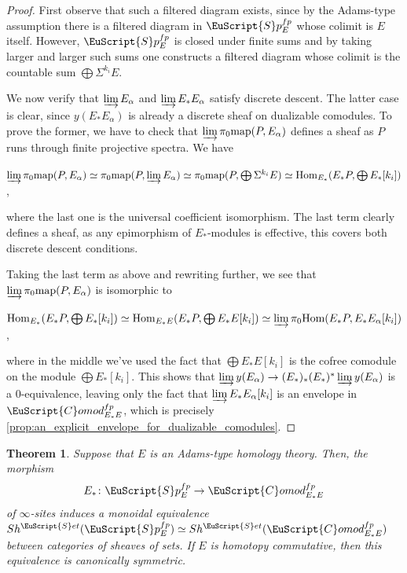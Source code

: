 \documentclass[oneside,a4paper]{amsart}
\newcommand{\euscr}[1]{\EuScript{#1}} %
\newcommand{\Hom}{\textnormal{Hom}} %
\newcommand{\map}{\textnormal{map}} %
\newcommand{\spectra}{\euscr{S}p} %
\newcommand{\sets}{\euscr{S}et} %
\newcommand{\spectrafp}{\spectra_{E}^{fp}} %
\newcommand{\Comod}{\euscr{C}omod} %
\newcommand{\ComodE}{\Comod_{E_{*}E}} %
\theoremstyle{plain}
\newtheorem{thm}{Theorem}[section]
\theoremstyle{definition}
\theoremstyle{remark}
\begin{document}
\begin{proof}
First observe that such a filtered diagram exists, since by the Adams-type assumption there is a filtered diagram in $\spectrafp$ whose colimit is $E$ itself. However, $\spectrafp$ is closed under finite sums and by taking larger and larger such sums one constructs a filtered diagram whose colimit is the countable sum $\bigoplus \Sigma^{k_{i}} E$. 

We now verify that $\varinjlim E_{\alpha}$ and $\varinjlim E_{*}E_{\alpha}$ satisfy discrete descent. The latter case is clear, since $y(E_{*}E_{\alpha})$ is already a discrete sheaf on dualizable comodules. To prove the former, we have to check that $\varinjlim \pi_{0} \map(P, E_{\alpha})$ defines a sheaf as $P$ runs through finite projective spectra. We have 

\begin{center}
$\varinjlim \pi_{0} \map(P, E_{\alpha}) \simeq \pi_{0} \map(P, \varinjlim E_{\alpha}) \simeq \pi_{0} \map(P, \bigoplus \Sigma^{k_{i}} E) \simeq \Hom_{E_{*}}(E_{*}P, \bigoplus E_{*}[k_{i}])$,
\end{center}
where the last one is the universal coefficient isomorphism. The last term clearly defines a sheaf, as any epimorphism of $E_{*}$-modules is effective, this covers both discrete descent conditions. 

Taking the last term as above and rewriting further, we see that $\varinjlim \pi_{0} \map(P, E_{\alpha})$ is isomorphic to

\begin{center}
$\Hom_{E_{*}}(E_{*}P, \bigoplus E_{*}[k_{i}]) \simeq \Hom_{E_{*}E}(E_{*}P, \bigoplus E_{*}E[k_{i}]) \simeq \varinjlim \pi_{0} \Hom(E_{*}P, E_{*}E_{\alpha}[k_{i}])$,
\end{center}
where in the middle we've used the fact that $\bigoplus E_{*}E[k_{i}]$ is the cofree comodule on the module $\bigoplus E_{*}[k_{i}]$. This shows that $\varinjlim y(E_{\alpha}) \rightarrow (E_{*})_{*} (E_{*})^{*} \varinjlim y(E_{\alpha})$ is a $0$-equivalence, leaving only the fact that $\varinjlim E_{*} E_{\alpha}[k_{i}]$ is an envelope in $\ComodE^{fp}$, which is precisely \cref{prop:an_explicit_envelope_for_dualizable_comodules}. 
\end{proof}

\begin{thm}
\label{thm:homology_functor_has_covering_lifting_property}
Suppose that $E$ is an Adams-type homology theory. Then, the morphism \[
E_{*} \colon \spectrafp \rightarrow \ComodE^{fp}
\]
of $\infty$-sites induces a monoidal equivalence $Sh^{\sets}(\spectrafp) \simeq Sh^{\sets}(\ComodE^{fp})$ between categories of sheaves of sets. If $E$ is homotopy commutative, then this equivalence is canonically symmetric. 
\end{thm}
\end{document}
